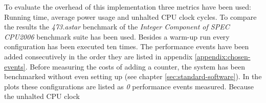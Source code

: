 \label{sec:overhead}

To evaluate the overhead of this implementation three metrics have been used:
Running time, average power usage and unhalted CPU clock cycles. To compare the
results the \emph{473.astar} benchmark of the \emph{Integer Component of SPEC
CPU2006} benchmark suite has been used. Besides a warm-up run every
configuration has been executed ten times. The performance events have been
added consecutively in the order they are listed in appendix
\ref{appendix:chosen-events}. Before measuring the costs of adding a counter,
the system has been benchmarked without even setting up \JWTlibpfm{} (see
chapter \ref{sec:standard-software}). In the plots these configurations are
listed as \emph{0} performance events measured. Because the unhalted CPU clock
